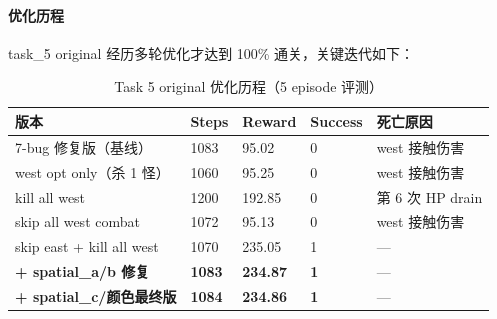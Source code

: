 \documentclass[12pt,a4paper]{ctexart}
\begin{document}
\paragraph{优化历程}

task\_5 original 经历多轮优化才达到 100\% 通关，关键迭代如下：

\begin{table}[H]
\centering
\begin{tabular}{p{}p{}p{}p{}p{}}
\toprule
版本 & Steps & Reward & Success & 死亡原因 \\
\midrule
7-bug 修复版（基线） & 1083 & 95.02 & 0 & west 接触伤害 \\
west opt only（杀 1 怪） & 1060 & 95.25 & 0 & west 接触伤害 \\
kill all west & 1200 & 192.85 & 0 & 第 6 次 HP drain \\
skip all west combat & 1072 & 95.13 & 0 & west 接触伤害 \\
skip east + kill all west & 1070 & 235.05 & 1 & — \\
\textbf{+ spatial\_a/b 修复} & \textbf{1083} & \textbf{234.87} & \textbf{1} & — \\
\textbf{+ spatial\_c/颜色最终版} & \textbf{1084} & \textbf{234.86} & \textbf{1} & — \\
\bottomrule
\end{tabular}
\caption{Task 5 original 优化历程（5 episode 评测）}
\label{tab:task5-optimization}
\end{table}
\end{document}
